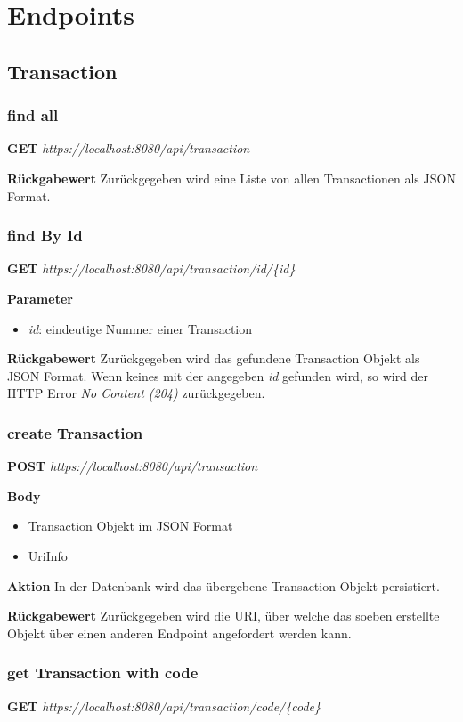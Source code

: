\section{Endpoints}
\subsection{Transaction}
\subsubsection{find all}
\textbf{GET} \emph{https://localhost:8080/api/transaction}

\textbf{Rückgabewert}
Zurückgegeben wird eine Liste von allen Transactionen als JSON
Format.

\subsubsection{find By Id}
\textbf{GET} \emph{https://localhost:8080/api/transaction/id/\{id\}}

\textbf{Parameter}
\begin{itemize}
    \item \emph{id}: eindeutige Nummer einer Transaction
\end{itemize}

\textbf{Rückgabewert}
Zurückgegeben wird das gefundene Transaction Objekt als JSON Format. Wenn keines mit der angegeben \emph{id} gefunden wird, so wird der
HTTP Error \emph{No Content (204)} zurückgegeben.

\subsubsection{create Transaction}
\textbf{POST} \emph{https://localhost:8080/api/transaction}

\textbf{Body}
\begin{itemize}
    \item Transaction Objekt im JSON Format
    \item UriInfo
\end{itemize}

\textbf{Aktion}
In der Datenbank wird das übergebene Transaction Objekt persistiert.

\textbf{Rückgabewert}
Zurückgegeben wird die URI, über welche das soeben erstellte Objekt über einen anderen Endpoint angefordert werden kann.

\subsubsection{get Transaction with code}
\textbf{GET} \emph{https://localhost:8080/api/transaction/code/\{code\}}

